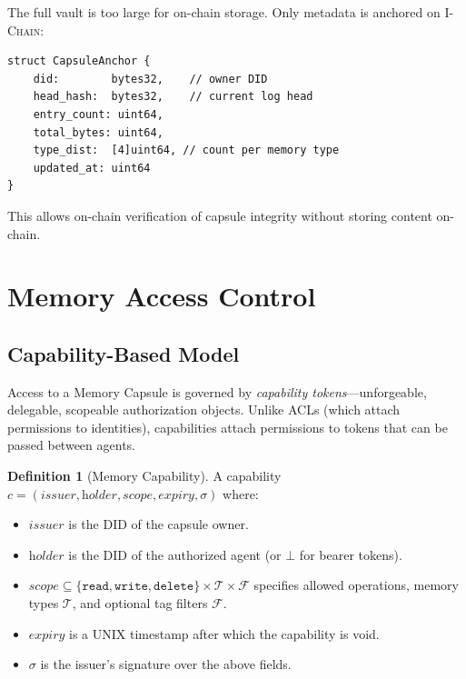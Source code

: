 \documentclass[11pt,letterpaper]{article}
\theoremstyle{definition}
\newtheorem{definition}{Definition}
\theoremstyle{remark}
\newcommand{\IChain}{\textsc{I-Chain}}
\newcommand{\DID}{\textsc{DID}}
\begin{document}
The full vault is too large for on-chain storage. Only metadata is anchored on \IChain{}:

\begin{verbatim}
struct CapsuleAnchor {
    did:        bytes32,    // owner DID
    head_hash:  bytes32,    // current log head
    entry_count: uint64,
    total_bytes: uint64,
    type_dist:  [4]uint64, // count per memory type
    updated_at: uint64
}
\end{verbatim}

This allows on-chain verification of capsule integrity without storing content on-chain.

\section{Memory Access Control}
\label{sec:access}

\subsection{Capability-Based Model}

Access to a Memory Capsule is governed by \emph{capability tokens}---unforgeable, delegable, scopeable authorization objects. Unlike ACLs (which attach permissions to identities), capabilities attach permissions to tokens that can be passed between agents.

\begin{definition}[Memory Capability]
A capability $c = (\textit{issuer}, \textit{holder}, \textit{scope}, \textit{expiry}, \sigma)$ where:
\begin{itemize}
    \item $\textit{issuer}$ is the \DID{} of the capsule owner.
    \item $\textit{holder}$ is the \DID{} of the authorized agent (or $\bot$ for bearer tokens).
    \item $\textit{scope} \subseteq \{\texttt{read}, \texttt{write}, \texttt{delete}\} \times \mathcal{T} \times \mathcal{F}$ specifies allowed operations, memory types $\mathcal{T}$, and optional tag filters $\mathcal{F}$.
    \item $\textit{expiry}$ is a UNIX timestamp after which the capability is void.
    \item $\sigma$ is the issuer's signature over the above fields.
\end{itemize}
\end{definition}
\end{document}
